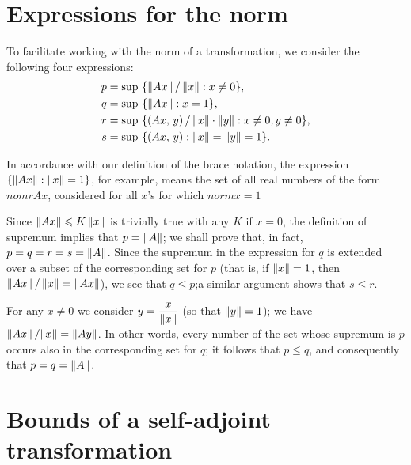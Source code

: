 \section{Expressions for the norm}

To facilitate working with the norm of a transformation, we consider the
following four expressions:
\begin{align*}
    p &= \sup~\{\left\lVert Ax\right\rVert/\left\lVert x\right\rVert : x \neq 0\},\\
    q &= \sup~\{\left\lVert Ax\right\rVert : x = 1\},\\
    r &= \sup~\{\left(Ax,\,y\right)/\left\lVert x\right\rVert \cdot \left\lVert y\right\rVert : x \neq 0, y \neq 0\},\\
    s &= \sup~\{\left(Ax,\,y\right) : \left\lVert x\right\rVert = \left\lVert y\right\rVert = 1\}.
\end{align*}

In accordance with our definition of the brace notation, the expression
\(\{\left\lVert Ax\right\rVert : \left\lVert x\right\rVert = 1\}\), for example, means the set of all real numbers
of the form \(nomr{Ax}\), considered for all \(x\)'s for which \(norm{x} = 1\)

Since \(\left\lVert Ax\right\rVert \leqslant K \left\lVert x\right\rVert\) is trivially true with any \(K\) if \(x =
0\), the definition of supremum implies that \(p = \left\lVert A\right\rVert\); we shall prove
that, in fact, \(p = q = r = s = \left\lVert A\right\rVert\). Since the supremum in the
expression for \(q\) is extended over a subset of the corresponding set for
\(p\) (that is, if  \(\left\lVert x\right\rVert = 1\), then \(\left\lVert Ax\right\rVert/\left\lVert x\right\rVert = \left\lVert Ax\right\rVert\)),
we see that \(q \leq p\);a similar argument shows that \(s \leq r\).

For any \(x \neq 0\) we consider \(\displaystyle y = \frac{x}{\left\lVert x\right\rVert}\) (so
that \(\left\lVert y\right\rVert = 1\)); we have \(\left\lVert Ax\right\rVert/{\left\lVert x\right\rVert} = \left\lVert Ay\right\rVert\). In other
words, every number of the set whose supremum is \(p\) occurs also in the
corresponding set for \(q\); it follows that \(p \leq q\), and consequently that
\(p = q = \left\lVert A\right\rVert\).

\section{Bounds of a self-adjoint transformation}

